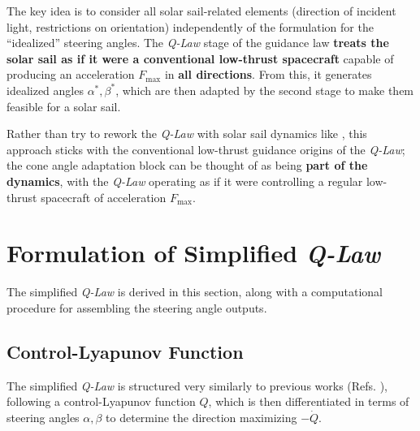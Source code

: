 The key idea is to consider all solar sail-related elements (direction of incident light, restrictions on orientation) independently of the formulation for the ``idealized'' steering angles. The \textit{Q-Law} stage of the guidance law \textbf{treats the solar sail as if it were a conventional low-thrust spacecraft} capable of producing an acceleration \(F_{\max}\) in \textbf{all directions}. From this, it generates idealized angles \(\alpha^*, \beta^*\), which are then adapted by the second stage to make them feasible for a solar sail.

Rather than try to rework the \textit{Q-Law} with solar sail dynamics like \cite{oguri2023solar}, this approach sticks with the conventional low-thrust guidance origins of the \textit{Q-Law}; the cone angle adaptation block can be thought of as being \textbf{part of the dynamics}, with the \textit{Q-Law} operating as if it were controlling a regular low-thrust spacecraft of acceleration  \(F_{\max}\).

\section{Formulation of Simplified \textit{Q-Law}}
The simplified \textit{Q-Law} is derived in this section, along with a computational procedure for assembling the steering angle outputs.

\subsection{Control-Lyapunov Function}
The simplified \textit{Q-Law} is structured very similarly to previous works (Refs. \cite{petropoulos2004low, vargaperez2016, sanjeev2023}), following a control-Lyapunov function \(Q\), which is then differentiated in terms of steering angles \(\alpha, \beta\) to determine the direction maximizing \(-\dot{Q}\).

